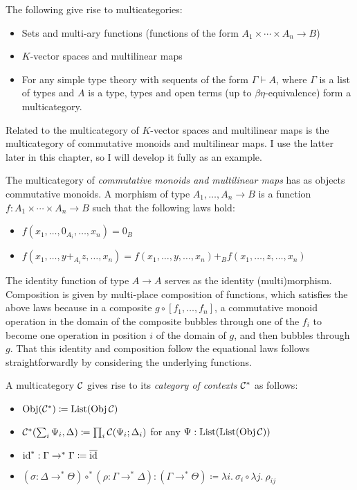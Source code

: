 \begin{example}
  The following give rise to multicategories:
  \begin{itemize}
    \item Sets and multi-ary functions (functions of the form
      $A_1 \times \cdots \times A_n \to B$)
    \item $K$-vector spaces and multilinear maps
    \item For any simple type theory with sequents of the form
      $\Gamma \vdash A$, where $\Gamma$ is a list of types and $A$ is a type,
      types and open terms (up to $\beta\eta$-equivalence) form a multicategory.
  \end{itemize}
\end{example}

Related to the multicategory of $K$-vector spaces and multilinear maps is the
multicategory of commutative monoids and multilinear maps.
I use the latter later in this chapter, so I will
develop it fully as an example.

\begin{example}
  The multicategory of \emph{commutative monoids and multilinear maps} has as
  objects commutative monoids.
  A morphism of type $A_1, \ldots, A_n \to B$ is a function
  $f : A_1 \times \cdots \times A_n \to B$ such that the following laws hold:
  \begin{itemize}
    \item $f(x_1, \ldots, 0_{A_i}, \ldots, x_n) = 0_B$
    \item $f(x_1, \ldots, y +_{A_i} z, \ldots, x_n) =
      f(x_1, \ldots, y, \ldots, x_n) +_B f(x_1, \ldots, z, \ldots, x_n)$
  \end{itemize}
  The identity function of type $A \to A$ serves as the identity
  (multi)morphism.
  Composition is given by multi-place composition of functions, which satisfies
  the above laws because in a composite $g \circ [f_1, \ldots, f_n]$, a
  commutative monoid operation in the domain of the composite bubbles through
  one of the $f_i$ to become one operation in position $i$ of the domain of $g$,
  and then bubbles through $g$.
  That this identity and composition follow the equational laws follows
  straightforwardly by considering the underlying functions.
\end{example}

\begin{definition}
  A multicategory $\mathcal C$ gives rise to its \emph{category of contexts} $\mathcal C^*$ as
  follows:
  \begin{itemize}
    \item $\operatorname{Obj}(\mathcal C^*) \coloneqq \operatorname{List}(\operatorname{Obj}\mathcal C)$
    \item $\C^*\plr{\sum_i \Psi_i, \Delta} \coloneqq \prod_i \C(\Psi_i; \Delta_i)$
      for any $\Psi : \operatorname{List}(\operatorname{List}(\operatorname{Obj}\mathcal C))$
    \item $\operatorname{id}^* : \Gamma \to^* \Gamma \coloneqq \overline{\operatorname{id}}$
    \item $(\sigma : \Delta \to^* \Theta) \circ^* (\rho : \Gamma \to^* \Delta) :
      (\Gamma \to^* \Theta) \coloneqq \lambda i.~\sigma_i \circ \lambda j.~\rho_{ij}$
  \end{itemize}
\end{definition}

